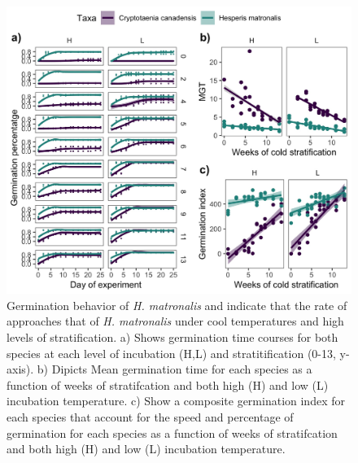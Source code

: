 \documentclass{article}\usepackage[]{graphicx}\usepackage[]{color}
\begin{document}
\begin{figure}[h!]
    \centering
         \includegraphics[width=\textwidth]{..//figure/crp_hesp1.jpeg}
    \caption{Germination behavior of \textit{H. matronalis} and  indicate that the rate of  approaches that of \textit{H. matronalis} under cool temperatures and high levels of stratification. a) Shows germination time courses for both species at each level of incubation (H,L) and stratitification (0-13, y-axis). b) Dipicts Mean germination time for each species as a function of weeks of stratifcation and both high (H) and low (L) incubation temperature. c) Show a composite germination index for each species that account for the speed and percentage of germination for each species as a function of weeks of stratifcation and both high (H) and low (L) incubation temperature. } 
    \label{fig:aft}
\end{figure}
\end{document}
